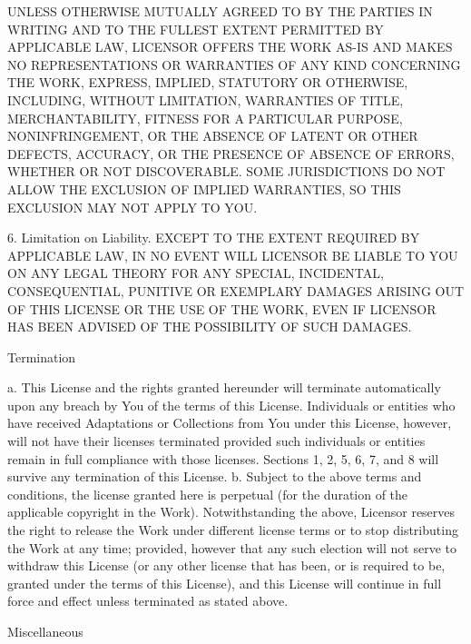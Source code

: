 UNLESS OTHERWISE MUTUALLY AGREED TO BY THE PARTIES IN WRITING AND TO THE
FULLEST EXTENT PERMITTED BY APPLICABLE LAW, LICENSOR OFFERS THE WORK AS-IS
AND MAKES NO REPRESENTATIONS OR WARRANTIES OF ANY KIND CONCERNING THE
WORK, EXPRESS, IMPLIED, STATUTORY OR OTHERWISE, INCLUDING, WITHOUT
LIMITATION, WARRANTIES OF TITLE, MERCHANTABILITY, FITNESS FOR A PARTICULAR
PURPOSE, NONINFRINGEMENT, OR THE ABSENCE OF LATENT OR OTHER DEFECTS,
ACCURACY, OR THE PRESENCE OF ABSENCE OF ERRORS, WHETHER OR NOT
DISCOVERABLE. SOME JURISDICTIONS DO NOT ALLOW THE EXCLUSION OF IMPLIED
WARRANTIES, SO THIS EXCLUSION MAY NOT APPLY TO YOU.

6. Limitation on Liability. EXCEPT TO THE EXTENT REQUIRED BY APPLICABLE
LAW, IN NO EVENT WILL LICENSOR BE LIABLE TO YOU ON ANY LEGAL THEORY FOR
ANY SPECIAL, INCIDENTAL, CONSEQUENTIAL, PUNITIVE OR EXEMPLARY DAMAGES
ARISING OUT OF THIS LICENSE OR THE USE OF THE WORK, EVEN IF LICENSOR HAS
BEEN ADVISED OF THE POSSIBILITY OF SUCH DAMAGES.

\item
Termination

 a. This License and the rights granted hereunder will terminate
    automatically upon any breach by You of the terms of this License.
    Individuals or entities who have received Adaptations or Collections
    from You under this License, however, will not have their licenses
    terminated provided such individuals or entities remain in full
    compliance with those licenses. Sections 1, 2, 5, 6, 7, and 8 will
    survive any termination of this License.
 b. Subject to the above terms and conditions, the license granted here is
    perpetual (for the duration of the applicable copyright in the Work).
    Notwithstanding the above, Licensor reserves the right to release the
    Work under different license terms or to stop distributing the Work at
    any time; provided, however that any such election will not serve to
    withdraw this License (or any other license that has been, or is
    required to be, granted under the terms of this License), and this
    License will continue in full force and effect unless terminated as
    stated above.

\item
Miscellaneous

